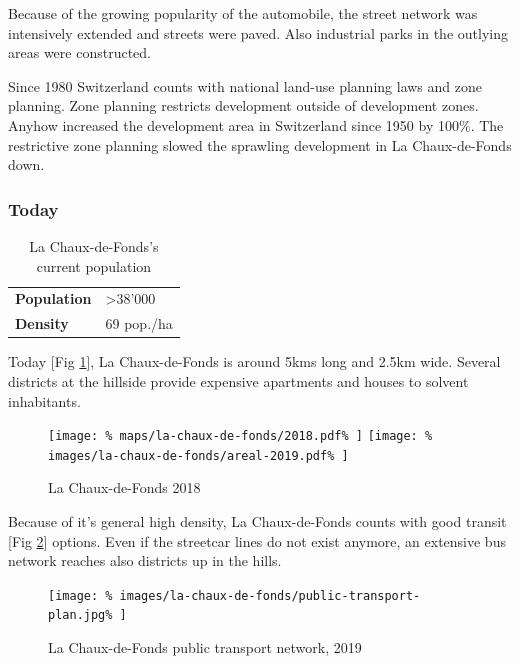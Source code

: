 \documentclass{article}
\begin{document}
\begin{multicols}{2}
			
			
			Because of the growing popularity of the automobile, the street network was intensively extended and streets were paved.
			Also industrial parks in the outlying areas were constructed.
			
			Since 1980 Switzerland counts with national land-use planning laws and zone planning. Zone planning restricts development outside of development zones. Anyhow increased the development area in Switzerland since 1950 by 100\%.
			The restrictive zone planning slowed the sprawling development in La Chaux-de-Fonds down.
			
			
			\subsubsection{Today}			
			
			\begin{table}[H]			
				\centering
				\caption{La Chaux-de-Fonds's current population}
				\label{table:la-chaux-de-fonds-population}
				\begin{tabular}{|l|l|}
					\hline
					\textbf{Population}  & \textgreater 38'000 \\
					\textbf{Density}     & 69 pop./ha \\
					\hline
				\end{tabular}
			\end{table}
			
			Today [Fig \ref{fig:map:la-chaux-de-fonds-2018}], La Chaux-de-Fonds is around 5kms long and 2.5km wide. Several districts at the hillside provide expensive apartments and houses to solvent inhabitants.
			
			\begin{figure}[H]
				\texttt{[image: \%
					maps/la-chaux-de-fonds/2018.pdf\%
				]}
				\texttt{[image: \%
					images/la-chaux-de-fonds/areal-2019.pdf\%
				]}
				\caption{La Chaux-de-Fonds 2018  \cite{MapGeoAdmin:LaChauxDeFonds}}
				\label{fig:map:la-chaux-de-fonds-2018}
			\end{figure}
			
			Because of it's general high density, La Chaux-de-Fonds counts with good transit [Fig \ref{fig:map:la-chaux-de-fonds-public-transport}] options. Even if the streetcar lines do not exist anymore, an extensive bus network reaches also districts up in the hills.
			
			
			
			\begin{figure}[H]
				\texttt{[image: \%
					images/la-chaux-de-fonds/public-transport-plan.jpg\%
				]}
				\caption{La Chaux-de-Fonds public transport network, 2019  \cite{TransN:LaChauxDeFonds}}
				\label{fig:map:la-chaux-de-fonds-public-transport}
			\end{figure}
			

\end{multicols}
\end{document}
